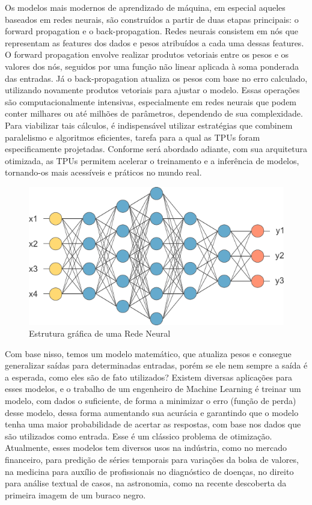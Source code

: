 \documentclass{report}
\begin{document}
Os modelos mais modernos de aprendizado de máquina, em especial aqueles baseados em redes neurais, são construídos a partir de duas etapas principais: o forward propagation e o back-propagation. Redes neurais consistem em nós que representam as features dos dados e pesos atribuídos a cada uma dessas features. O forward propagation envolve realizar produtos vetoriais entre os pesos e os valores dos nós, seguidos por uma função não linear aplicada à soma ponderada das entradas. Já o back-propagation atualiza os pesos com base no erro calculado, utilizando novamente produtos vetoriais para ajustar o modelo.
Essas operações são computacionalmente intensivas, especialmente em redes neurais que podem conter milhares ou até milhões de parâmetros, dependendo de sua complexidade. Para viabilizar tais cálculos, é indispensável utilizar estratégias que combinem paralelismo e algoritmos eficientes, tarefa para a qual as TPUs foram especificamente projetadas. Conforme será abordado adiante, com sua arquitetura otimizada, as TPUs permitem acelerar o treinamento e a inferência de modelos, tornando-os mais acessíveis e práticos no mundo real.

\begin{figure}[h]
	\includegraphics[scale=0.7]{neuralNetwork}
	\centering
	\caption{Estrutura gráfica de uma Rede Neural}
\end{figure}

Com base nisso, temos um modelo matemático, que atualiza pesos e consegue generalizar saídas para determinadas entradas, porém se ele nem sempre a saída é a esperada, como eles são de fato utilizados? Existem diversas aplicações para esses modelos, e o trabalho de um engenheiro de Machine Learning é treinar um modelo, com dados o suficiente, de forma a minimizar o erro (função de perda) desse modelo, dessa forma aumentando sua acurácia e garantindo que o modelo tenha uma maior probabilidade de acertar as respostas, com base nos dados que são utilizados como entrada. Esse é um clássico problema de otimização. Atualmente, esses modelos tem diversos usos na indústria, como no mercado financeiro, para predição de séries temporais para variações da bolsa de valores, na medicina para auxílio de profissionais no diagnóstico de doenças, no direito para análise textual de casos, na astronomia, como na recente descoberta da primeira imagem de um buraco negro. 
\end{document}
